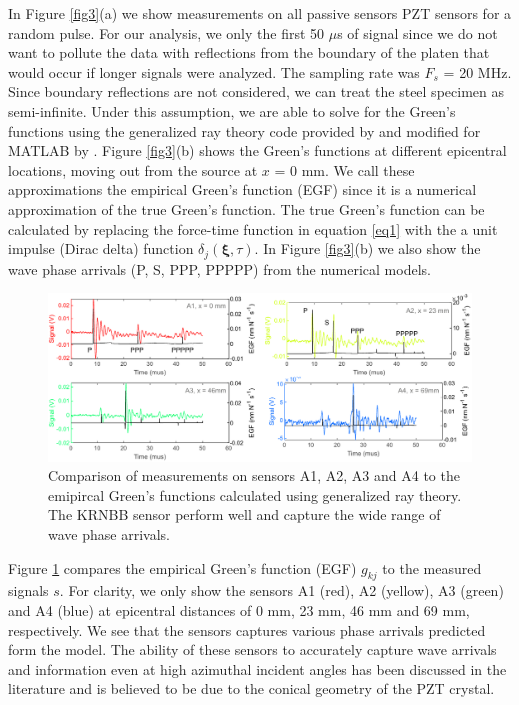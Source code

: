 \documentclass[preprint,3p, 11pt,authoryear]{elsarticle}
\begin{document}
In Figure \ref{fig3}(a) we show measurements on all passive sensors PZT sensors for a random pulse. For our analysis, we only the first 50 $\mu$s of signal since we do not want to pollute the data with reflections from the boundary of the platen that would occur if longer signals were analyzed. The sampling rate was $F_{s}$ = 20 MHz. Since boundary reflections are not considered, we can treat the steel specimen as semi-infinite. Under this assumption, we are able to solve for the Green's functions using the generalized ray theory code provided by \citet{Hsu1985} and modified for MATLAB by \citet{McLaskey2012}.  Figure \ref{fig3}(b) shows the Green's functions at different epicentral locations, moving out from the source at $x$ = 0 mm. We call these approximations the empirical Green's function (EGF) since it is a numerical approximation of the true Green's function.  The true Green's function can be calculated by replacing the force-time function in equation \eqref{eq1} with the a unit impulse (Dirac delta) function $\delta_{j}(\mathbf{\xi}, \tau)$. In Figure \ref{fig3}(b) we also show the wave phase arrivals (P, S, PPP, PPPPP) from the numerical models.

\begin{figure}[ht]
     	\centering
\includegraphics[scale= 0.90]{FIG4.pdf} 
\caption{Comparison of measurements on sensors A1, A2, A3 and A4 to the emipircal Green's functions calculated using generalized ray theory. The KRNBB sensor perform well and capture the wide range of wave phase arrivals.}
	\label{fig4} 
\end{figure}

Figure \ref{fig4} compares the empirical Green's function (EGF) $g_{kj}$ to the measured signals $s$.  For clarity, we only show the sensors A1 (red), A2 (yellow), A3 (green) and A4 (blue) at epicentral distances of 0 mm, 23 mm, 46 mm and 69 mm, respectively. We see that the sensors captures various phase arrivals predicted form the model. The ability of these sensors to accurately capture wave arrivals and information even at high azimuthal incident angles has been discussed in the literature \citep{Goodfellow2015, Selvadurai2019} and is believed to be due to the conical geometry of the PZT crystal. 
\end{document}
